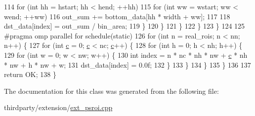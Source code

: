 \begin{DoxyCode}
114                             \textcolor{keywordflow}{for} (\textcolor{keywordtype}{int} hh = hstart; hh < hend; ++hh)
115                                 \textcolor{keywordflow}{for} (\textcolor{keywordtype}{int} ww = wstart; ww < wend; ++ww)
116                                     out\_sum += bottom\_data[hh * width + ww];
117 
118                             dst\_data[index] = out\_sum / bin\_area;
119                         \}
120                     \}
121                 \}
122             \}
123         \}
124 
125 \textcolor{preprocessor}{        #pragma omp parallel for schedule(static)}
126         \textcolor{keywordflow}{for} (\textcolor{keywordtype}{int} n = real\_rois; n < nn; n++) \{
127             \textcolor{keywordflow}{for} (\textcolor{keywordtype}{int} \hyperlink{CMakeCache_8txt_aac1d6a1710812201527c735f7c6afbaa}{c} = 0; \hyperlink{CMakeCache_8txt_aac1d6a1710812201527c735f7c6afbaa}{c} < nc; \hyperlink{CMakeCache_8txt_aac1d6a1710812201527c735f7c6afbaa}{c}++) \{
128                 \textcolor{keywordflow}{for} (\textcolor{keywordtype}{int} h = 0; h < nh; h++) \{
129                     \textcolor{keywordflow}{for} (\textcolor{keywordtype}{int} w = 0; w < nw; w++) \{
130                         \textcolor{keywordtype}{int} index = n * nc * nh * nw + \hyperlink{CMakeCache_8txt_aac1d6a1710812201527c735f7c6afbaa}{c} * nh * nw + h * nw + w;
131                         dst\_data[index] = 0.0f;
132                     \}
133                 \}
134             \}
135         \}
136 
137         \textcolor{keywordflow}{return} OK;
138     \}
\end{DoxyCode}


The documentation for this class was generated from the following file\+:\begin{DoxyCompactItemize}
\item 
thirdparty/extension/\hyperlink{ext__psroi_8cpp}{ext\+\_\+psroi.\+cpp}\end{DoxyCompactItemize}
